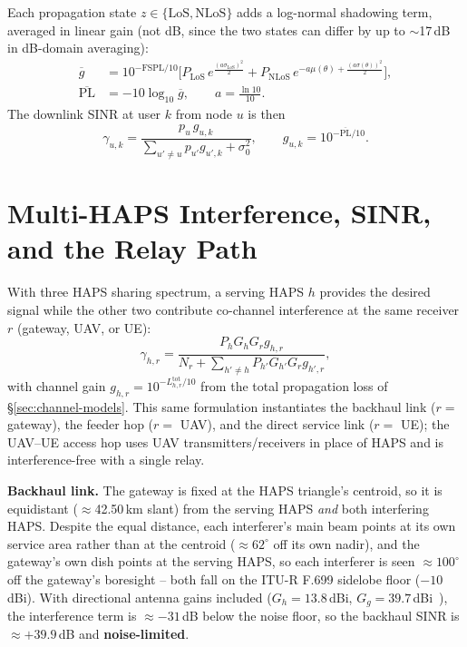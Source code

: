 \documentclass[]{ieeeaccess}
\begin{document}
Each propagation state $z\in\{\mathrm{LoS,NLoS}\}$ adds a log-normal shadowing term, averaged in linear gain (not dB, since the two states can differ by up to $\sim$17\,dB in dB-domain averaging):
\begin{align}
\overline{g} &= 10^{-\mathrm{FSPL}/10}\Big[P_\mathrm{LoS}\,e^{\tfrac{(a\sigma_\mathrm{LoS})^2}{2}} + P_\mathrm{NLoS}\,e^{-a\mu(\theta)+\tfrac{(a\sigma(\theta))^2}{2}}\Big],\nonumber\\
\overline{\mathrm{PL}} &= -10\log_{10}\overline{g}, \qquad a=\tfrac{\ln 10}{10}.
\label{eq:pl}
\end{align}
The downlink SINR at user $k$ from node $u$ is then
\begin{equation}
\gamma_{u,k} = \frac{p_u\,g_{u,k}}{\sum_{u'\neq u} p_{u'} g_{u',k} + \sigma_0^2}, \qquad g_{u,k}=10^{-\overline{\mathrm{PL}}/10}.
\label{eq:sinr}
\end{equation}

\section{Multi-HAPS Interference, SINR, and the Relay Path}
\label{sec:multihaps}

With three HAPS sharing spectrum, a serving HAPS $h$ provides the desired signal while the other two contribute co-channel interference at the same receiver $r$ (gateway, UAV, or UE):
\begin{equation}
\gamma_{h,r}=\frac{P_hG_hG_r g_{h,r}}{N_r + \displaystyle\sum_{h'\neq h}P_{h'}G_{h'}G_r g_{h',r}},
\label{eq:general-haps-sinr}
\end{equation}
with channel gain $g_{h,r}=10^{-L_{h,r}^\mathrm{tot}/10}$ from the total propagation loss of \S\ref{sec:channel-models}. This same formulation instantiates the backhaul link ($r=$ gateway), the feeder hop ($r=$ UAV), and the direct service link ($r=$ UE); the UAV--UE access hop uses UAV transmitters/receivers in place of HAPS and is interference-free with a single relay.

\textbf{Backhaul link.} The gateway is fixed at the HAPS triangle's centroid, so it is equidistant ($\approx$42.50\,km slant) from the serving HAPS \emph{and} both interfering HAPS. Despite the equal distance, each interferer's main beam points at its own service area rather than at the centroid ($\approx62^\circ$ off its own nadir), and the gateway's own dish points at the serving HAPS, so each interferer is seen $\approx100^\circ$ off the gateway's boresight -- both fall on the ITU-R F.699 sidelobe floor ($-10$\,dBi). With directional antenna gains included ($G_h=13.8$\,dBi, $G_g=39.7$\,dBi~\cite{karaman2025haps}), the interference term is $\approx-31$\,dB below the noise floor, so the backhaul SINR is $\approx+39.9$\,dB and \textbf{noise-limited}.
\end{document}
